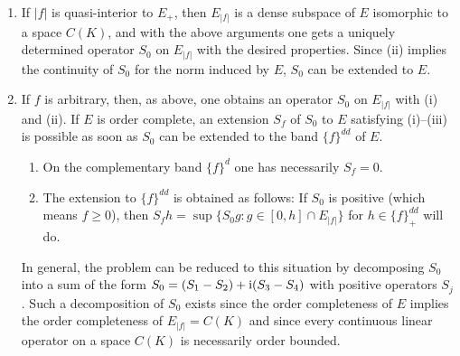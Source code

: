 \begin{enumerate}[\textbullet, wide, labelindent=.25em]

\item 
If\/ $ |f| $ is quasi-interior to $ E_{+} $, then $ E_{|f|} $ is a dense subspace of\/ $ E $ isomorphic to a space $ C(K) $, and with the above arguments one gets a uniquely determined operator $ S_{0} $ on $ E_{|f|} $ with the desired properties.
Since (ii) implies the continuity of\/ $ S_{0} $ for the norm induced by $ E $, $ S_{0} $ can be extended to $ E $.

\item 
If\/ $ f $ is arbitrary, then, as above, one obtains an operator $ S_{0} $ on $ E_{|f|} $ with (i) and (ii).
If\/ $ E $ is order complete, an extension $ S_{f} $ of\/ $ S_{0} $ to $ E $ satisfying (i)--(iii) is possible as soon as $ S_{0} $ can be extended to the band $ \{f\}^{dd} $ of\/ $ E $.
\begin{enumerate}[--, labelindent=2em]
\item
On the complementary band $ \{f\}^{d} $ one has necessarily $ S_{f} = 0 $.

\item
The extension to $ \{f\}^{dd} $ is obtained as follows:
If\/ $ S_{0} $ is positive (which means $ f \geq 0 $), then 
$ S_{f}h = \sup \{ S_{0}g \colon g \in [0,h] \cap E_{|f|} \} $ for $ h \in \{f\}^{dd}_{+} $ will do.
\end{enumerate}
In general, the problem can be reduced to this situation by decomposing $ S_{0} $ into a sum of the form $ S_{0} = (S_{1} - S_{2}) + \mathrm{i}(S_{3} - S_{4}) $ with positive operators $ S_{j} $.
Such a decomposition of\/ $ S_{0} $ exists since the order completeness of\/ $ E $ implies the order completeness of\/ $ E_{|f|} = C(K) $ and since every continuous linear operator on a space $ C(K) $ is necessarily order bounded.
\end{enumerate}
